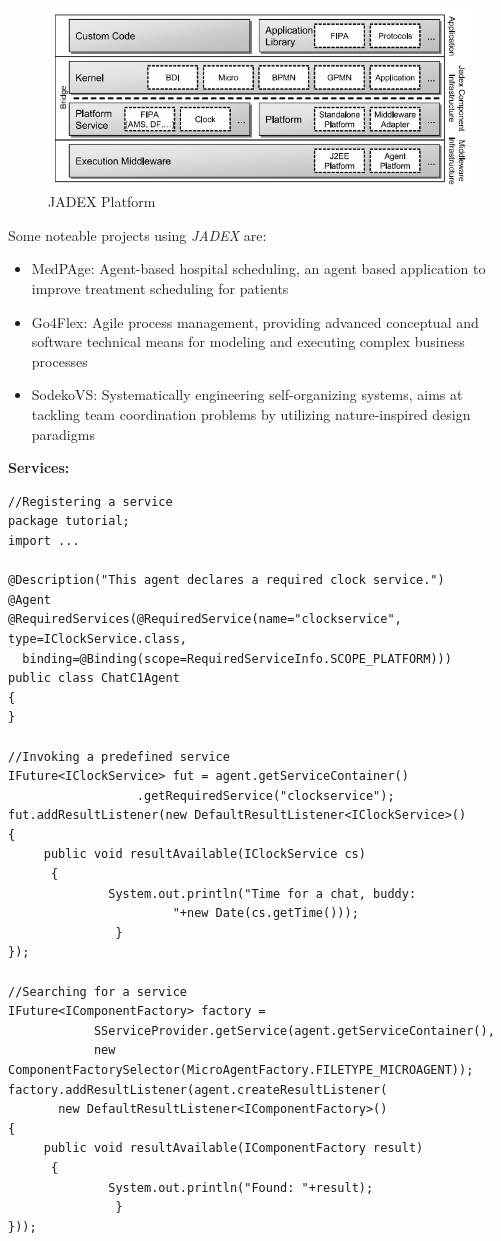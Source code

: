 \documentclass[a4paper, 11pt]{article}
\begin{document}
\begin{figure}[H]
	\caption{JADEX Platform}
	\centering
	\includegraphics[scale=0.7]{./images/jadex_platform.png}
\end{figure}

\clearpage

\noindent Some noteable projects using \textit{JADEX} are:
\begin{itemize}
	\item MedPAge: Agent-based hospital scheduling, an agent based application to improve treatment scheduling for patients
	\item Go4Flex: Agile process management, providing advanced conceptual and software technical means for modeling and executing complex business processes
	\item SodekoVS: Systematically engineering self-organizing systems, aims at tackling team coordination problems by utilizing nature-inspired design paradigms
\end{itemize}

\noindent \textbf{Services:} \\
\begin{verbatim}
//Registering a service
package tutorial;
import ...

@Description("This agent declares a required clock service.")
@Agent
@RequiredServices(@RequiredService(name="clockservice", type=IClockService.class,
  binding=@Binding(scope=RequiredServiceInfo.SCOPE_PLATFORM)))
public class ChatC1Agent
{
}

//Invoking a predefined service
IFuture<IClockService> fut = agent.getServiceContainer()
                  .getRequiredService("clockservice");
fut.addResultListener(new DefaultResultListener<IClockService>()
{
     public void resultAvailable(IClockService cs)
      {
              System.out.println("Time for a chat, buddy:
                       "+new Date(cs.getTime()));
               }
});

//Searching for a service
IFuture<IComponentFactory> factory = 
            SServiceProvider.getService(agent.getServiceContainer(),
            new ComponentFactorySelector(MicroAgentFactory.FILETYPE_MICROAGENT));
factory.addResultListener(agent.createResultListener(
       new DefaultResultListener<IComponentFactory>()
{
     public void resultAvailable(IComponentFactory result)
      {
              System.out.println("Found: "+result);
               }
}));

\end{verbatim}
\end{document}
